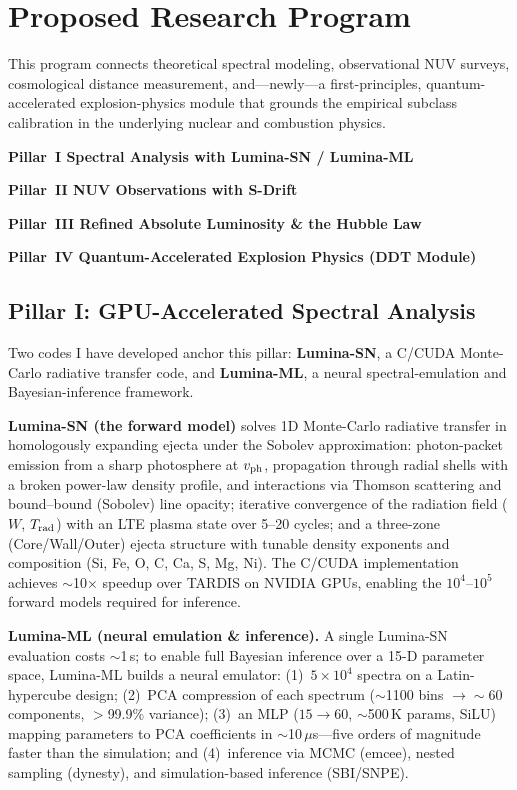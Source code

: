 \documentclass[11pt]{article}
\newcommand{\pillar}[3]{%
  \begin{tcolorbox}[enhanced,colback=#3,colframe=#2,boxrule=0pt,leftrule=3pt,
    arc=1pt,left=6pt,right=6pt,top=4pt,bottom=4pt,width=\linewidth]
  \textbf{\color{#2}#1}\end{tcolorbox}}
\newcommand{\code}[1]{{\small\ttfamily\color{inkblue}#1}}
\begin{document}
\section{Proposed Research Program}
This program connects theoretical spectral modeling, observational NUV surveys, cosmological
distance measurement, and---newly---a first-principles, quantum-accelerated explosion-physics module
that grounds the empirical subclass calibration in the underlying nuclear and combustion physics.

\vspace{2pt}
\pillar{Pillar~I \;\textbar\; Spectral Analysis with Lumina-SN / Lumina-ML}{stellar}{paleblue}
\pillar{Pillar~II \;\textbar\; NUV Observations with S-Drift}{cyanacc}{palecyan}
\pillar{Pillar~III \;\textbar\; Refined Absolute Luminosity \& the Hubble Law}{gold}{palegold}
\pillar{Pillar~IV \;\textbar\; Quantum-Accelerated Explosion Physics (DDT Module)}{quantum}{palequant}

\subsection{Pillar I: GPU-Accelerated Spectral Analysis}
Two codes I have developed anchor this pillar: \textbf{Lumina-SN}, a C/CUDA Monte-Carlo radiative
transfer code, and \textbf{Lumina-ML}, a neural spectral-emulation and Bayesian-inference framework.

\textbf{Lumina-SN (the forward model)} solves 1D Monte-Carlo radiative transfer in homologously
expanding ejecta under the Sobolev approximation: photon-packet emission from a sharp photosphere at
$v_{\rm ph}$, propagation through radial shells with a broken power-law density profile, and
interactions via Thomson scattering and bound--bound (Sobolev) line opacity; iterative convergence
of the radiation field ($W$, $T_{\rm rad}$) with an LTE plasma state over 5--20 cycles; and a
three-zone (Core/Wall/Outer) ejecta structure with tunable density exponents and composition (Si,
Fe, O, C, Ca, S, Mg, Ni). The C/CUDA implementation achieves $\sim$10$\times$ speedup over TARDIS on
NVIDIA GPUs, enabling the $10^4$--$10^5$ forward models required for inference.

\textbf{Lumina-ML (neural emulation \& inference).} A single Lumina-SN evaluation costs $\sim$1\,s;
to enable full Bayesian inference over a 15-D parameter space, Lumina-ML builds a neural emulator:
(1)~$5\times10^4$ spectra on a Latin-hypercube design; (2)~PCA compression of each spectrum
($\sim$1100 bins $\to\sim$60 components, $>$99.9\% variance); (3)~an MLP ($15\to60$, $\sim$500\,K
params, SiLU) mapping parameters to PCA coefficients in $\sim$10\,$\mu$s---five orders of magnitude
faster than the simulation; and (4)~inference via MCMC (\code{emcee}), nested sampling
(\code{dynesty}), and simulation-based inference (SBI/SNPE).
\end{document}
